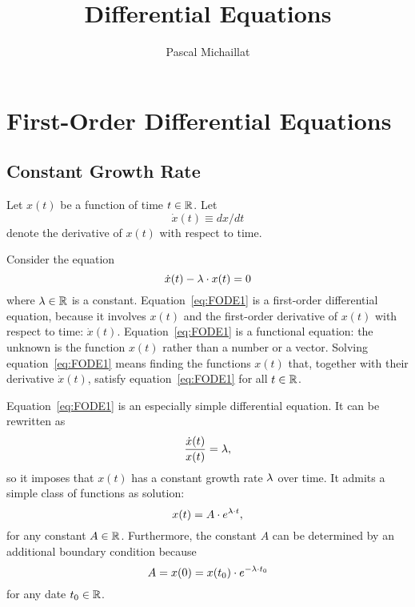 \documentclass[letterpaper,12pt,leqno]{article}
\begin{document}
\title{Differential Equations}
\author{Pascal Michaillat}
\date{}

\begin{titlepage}
\maketitle
\tableofcontents
\end{titlepage}

\section{First-Order Differential Equations}\label{sec:one}

\subsection{Constant Growth Rate}

Let $x(t)$ be a function of time $t\in\mathbb{R}$. Let \[\dot{x}(t)\equiv dx/dt\] denote the derivative of $x(t)$ with respect to time. 

Consider the equation 
\begin{equation}
\dot{x}(t) -\lambda\cdot x(t) = 0
\label{eq:FODE1}\end{equation}
where $\lambda\in\mathbb{R}$ is a constant. Equation~\eqref{eq:FODE1} is a first-order differential equation, because it involves $x(t)$ and the first-order derivative of $x(t)$ with respect to time: $\dot{x}(t)$.  Equation~\eqref{eq:FODE1} is a functional equation: the unknown is the function $x(t)$ rather than a number or a vector. Solving equation~\eqref{eq:FODE1} means finding the functions $x(t)$ that, together with their derivative $\dot{x}(t)$, satisfy equation~\eqref{eq:FODE1} for all $t \in \mathbb{R}$.

Equation~\eqref{eq:FODE1} is an especially simple differential equation. It can be rewritten as 
\[\frac{\dot{x}(t)}{x(t)}= \lambda,\]
so it imposes that $x(t)$ has a constant growth rate $\lambda$ over time. It admits a simple class of functions as solution:
\begin{equation}
x(t) =A\cdot  e^{\lambda \cdot t} \label{eq:FODE1sol},
\end{equation}
for any constant $A\in \mathbb{R}$. Furthermore, the constant $A$ can be determined by an additional boundary condition because
\[A=x(0)=x(t_{0})\cdot e^{-\lambda \cdot t_{0}}\]
for any date $t_{0}\in \mathbb{R}$.
\end{document}
